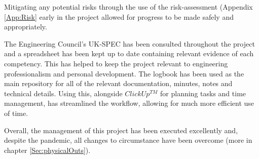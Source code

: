 Mitigating any potential risks through the use of the risk-assessment (Appendix \ref{App:Risk} early in the project allowed for progress to be made safely and appropriately. 

The Engineering Council's UK-SPEC has been consulted throughout the project and a spreadsheet has been kept up to date containing relevant evidence of each competency. This has helped to keep the project relevant to engineering professionalism and personal development. The logbook has been used as the main repository for all of the relevant documentation, minutes, notes and technical details. Using this, alongside $ClickUp^{TM}$ for planning tasks and time management, has streamlined the workflow, allowing for much more efficient use of time.

Overall, the management of this project has been executed excellently and, despite the pandemic, all changes to circumstance have been overcome (more in chapter \ref{Sec:physicalOuts}).



